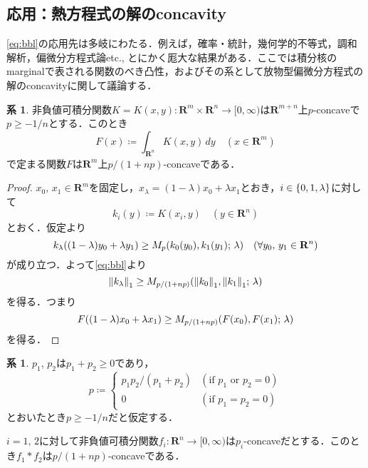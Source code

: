 \documentclass[a4j]{ltjsarticle}
\newcommand{\Rset}{\mathbf{R}}
\newcommand{\1}{\bm{1}}
\newcommand{\M}[4]{M_{#1}\qty(#2,#3;\,#4)}
\numberwithin{equation}{section}
\theoremstyle{definition}
\newtheorem{cor}[thm]{系}
\begin{document}
\subsection{応用：熱方程式の解のconcavity}
\eqref{eq:bbl}の応用先は多岐にわたる．例えば，確率・統計，幾何学的不等式，調和解析，偏微分方程式論etc., とにかく厖大な結果がある．ここでは積分核のmarginalで表される関数のべき凸性，およびその系として放物型偏微分方程式の解のconcavityに関して議論する．
\begin{cor}\label{cor:marginal_concavity}
    非負値可積分関数$K=K(x,y)\colon \Rset^m\times \Rset^n\to [0,\infty)$は$\Rset^{m+n}$上$p$-concaveで$p\geq -1/n$とする．このとき
    \begin{equation}
        F(x)\coloneqq \int_{\Rset^n}K(x,y)\,dy\quad (x\in\Rset^m)
    \end{equation}
    で定まる関数$F$は$\Rset^m$上$p/(1+np)$-concaveである．
\end{cor}
\begin{proof}
    $x_0,\,x_1\in \Rset^m$を固定し，$x_\lambda=(1-\lambda)x_0+\lambda x_1$とおき，$i\in \qty{0,1,\lambda}$に対して
    \begin{equation}
        k_i(y)\coloneqq K(x_i,y)\quad (y\in\Rset^n)
    \end{equation}
    とおく．仮定より
    \begin{equation}
        k_{\lambda}((1-\lambda)y_0+\lambda y_1)\geq \M{p}{k_0(y_0)}{k_1(y_1)}{\lambda}\quad (\forall y_0,\,y_1\in\Rset^n)
    \end{equation}
    が成り立つ．よって\eqref{eq:bbl}より
    \begin{equation}
        \norm{k_\lambda}_{1}\geq \M{p/(1+np)}{\norm{k_0}_1}{\norm{k_1}_{1}}{\lambda}
    \end{equation}
    を得る．つまり
    \begin{equation}
        F((1-\lambda)x_0+\lambda x_1)\geq \M{p/(1+np)}{F(x_0)}{F(x_1)}{\lambda}
    \end{equation}
    を得る．
\end{proof}
\begin{cor}\label{cor:conv_concavity}
    $p_1,\,p_2$は$p_1+p_2\geq0$であり，
    \begin{equation}
        p\coloneqq \begin{cases}
            p_1p_2/(p_1+p_2) & (\text{if $p_1$ or $p_2=0$})\\
            0 & (\text{if $p_1=p_2=0$})
        \end{cases}
    \end{equation}
    とおいたとき$p\geq -1/n$だと仮定する．

    $i=1,\,2$に対して非負値可積分関数$f_i\colon \Rset^n\to[0,\infty)$は$p_i$-concaveだとする．このとき$f_1\ast f_2$は$p/(1+np)$-concaveである．
\end{cor}
\end{document}
